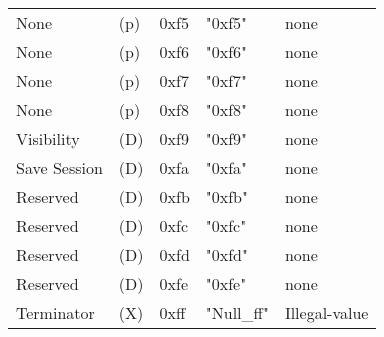 \begin{table}[htb!]
\begin{tabular}{l l l l l}
        None               & (p)  &  0xf5   & "0xf5"       & none \\
        None               & (p)  &  0xf6   & "0xf6"       & none \\
        None               & (p)  &  0xf7   & "0xf7"       & none \\
        None               & (p)  &  0xf8   & "0xf8"       & none \\
        Visibility         & (D)  &  0xf9   & "0xf9"       & none \\
        Save Session       & (D)  &  0xfa   & "0xfa"       & none \\
        Reserved           & (D)  &  0xfb   & "0xfb"       & none \\
        Reserved           & (D)  &  0xfc   & "0xfc"       & none \\
        Reserved           & (D)  &  0xfd   & "0xfd"       & none \\
        Reserved           & (D)  &  0xfe   & "0xfe"       & none \\
        Terminator         & (X)  &  0xff   & "Null\_ff"   &  Illegal-value \\
      \end{tabular}
   \end{table}

